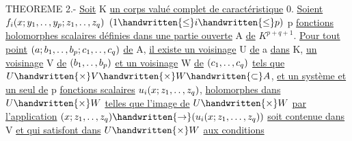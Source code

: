 THEOREME 2.- \uline{Soit} K \uline{un corps valué complet de caractéristique} 0. \uline{Soient} $f_i(x;y_1,\mathinner{\ldotp\ldotp},y_p;z_1,\mathinner{\ldotp\ldotp},z_q)$ $(1\handwritten{\leq}i\handwritten{\leq}p)$ p \uline{fonctions holomorphes scalaires définies dans une partie ouverte} A \uline{de} $K^{p+q+1}$. \uline{Pour tout point} $(a;b_1,\mathinner{\ldotp\ldotp},b_p;c_1,\mathinner{\ldotp\ldotp},c_q)$ \uline{de} A, \uline{il existe un voisinage} U \uline{de} a \uline{dans} K, \uline{un voisinage} V \uline{de} $(b_1,\mathinner{\ldotp\ldotp},b_p)$ \uline{et un voisinage} W \uline{de} $(c_1,\mathinner{\ldotp\ldotp},c_q)$ \uline{tels que} $U\handwritten{\times}V\handwritten{\times}W\handwritten{\subset}A$, \uline{et un système et un seul de} p \uline{fonctions scalaires} $u_i(x;z_1,\mathinner{\ldotp\ldotp},z_q)$, \uline{holomorphes dans} $U\handwritten{\times}W$ \uline{telles que l'image de} $U\handwritten{\times}W$ \uline{par l'application} $(x;z_1,\mathinner{\ldotp\ldotp},z_q)\handwritten{\to}(u_i(x;z_1,\ldots,z_q))$ \uline{soit contenue dans} V \uline{et qui satisfont dans} $U\handwritten{\times}W$ \uline{aux conditions}
